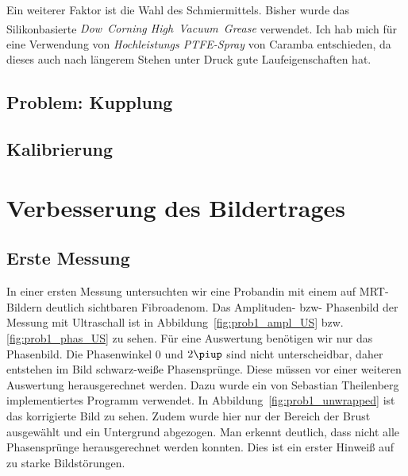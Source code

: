\documentclass[
    11pt,
    ngerman
]{scrreprt}
\begin{document}
Ein weiterer Faktor ist die Wahl des Schmiermittels. Bisher wurde das
Silikonbasierte \linebreak \emph{Dow~Corning\textsuperscript{\textregistered}
High~Vacuum~Grease} verwendet. Ich hab mich für eine Verwendung von \linebreak
\emph{Hochleistungs PTFE-Spray} von Caramba entschieden, da dieses
auch nach längerem Stehen unter Druck gute Laufeigenschaften hat.


\subsection{Problem: Kupplung}

\subsection{Kalibrierung}

\section{Verbesserung des Bildertrages}

\subsection{Erste Messung}

In einer ersten Messung untersuchten wir eine Probandin mit einem auf
MRT-Bildern deutlich sichtbaren Fibroadenom. Das Amplituden- bzw- Phasenbild
der Messung mit Ultraschall ist in Abbildung~\ref{fig:prob1_ampl_US} bzw.
\ref{fig:prob1_phas_US} zu sehen.  Für eine Auswertung benötigen wir nur das
Phasenbild. Die Phasenwinkel 0 und $2\piup$ sind nicht unterscheidbar, daher
entstehen im Bild schwarz-weiße Phasensprünge. Diese müssen vor einer weiteren
Auswertung herausgerechnet werden. Dazu wurde ein von Sebastian Theilenberg
implementiertes Programm verwendet. In Abbildung~\ref{fig:prob1_unwrapped} ist
das korrigierte Bild zu sehen. Zudem wurde hier nur der Bereich der Brust
ausgewählt und ein Untergrund abgezogen. Man erkennt deutlich, dass nicht alle
Phasensprünge herausgerechnet werden konnten. Dies ist ein erster Hinweiß auf
zu starke Bildstörungen.
\end{document}
